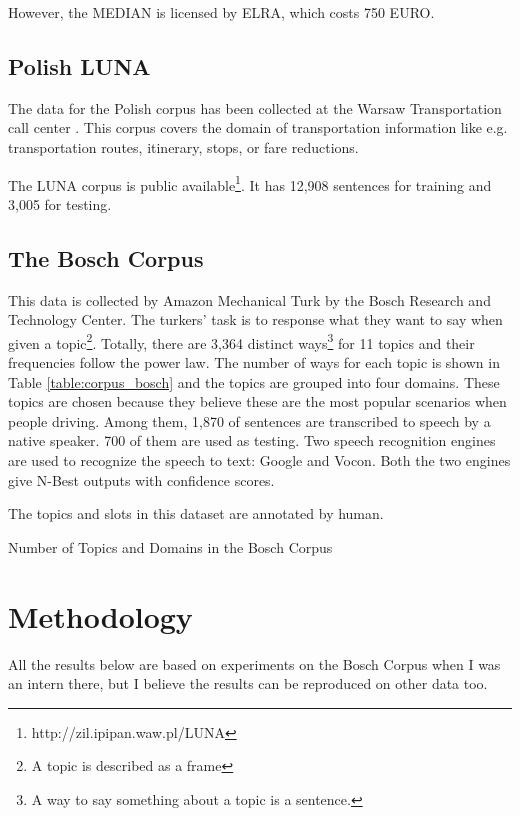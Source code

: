 \documentclass[11pt,letterpaper]{article}
\begin{document}
However, the MEDIAN is licensed by ELRA, which costs 750 EURO.

\subsection{Polish LUNA}
The data for the Polish corpus has been collected at the Warsaw Transportation call center \cite{Marasek:2008}. This corpus covers the domain of transportation information like e.g.  transportation routes, itinerary, stops, or fare reductions.

The LUNA corpus is public available\footnote{http://zil.ipipan.waw.pl/LUNA}. It has 12,908 sentences for training and 3,005 for testing.

\subsection{The Bosch Corpus}
This data is collected by Amazon Mechanical Turk by the Bosch Research and Technology Center. %
The turkers’ task is to response what they want to say when given a topic\footnote{A topic is described as a frame}. Totally, there are 3,364 distinct ways\footnote{A way to say something about a topic is a sentence.} for 11 topics and their frequencies follow the power law. The number of ways for each topic is shown in Table \ref{table:corpus_bosch} and the topics are grouped into four domains. These topics are chosen because they believe these are the most popular scenarios when people driving.
Among them, 1,870 of sentences are transcribed to speech by a native speaker. 700 of them are used as testing. Two speech recognition engines are used to recognize the speech to text: Google and Vocon. Both the two engines give N-Best outputs with confidence scores.

The topics and slots in this dataset are annotated by human. 

\begin{table}[!htb] 
\centering 
 
\caption{Number of Topics and Domains in the Bosch Corpus} 
\label{table:corpus_bosch} 
\end{table} 
 
\section{Methodology}
All the results below are based on experiments on the Bosch Corpus when I was an intern there, but I believe the results can be reproduced on other data too.
\end{document}
